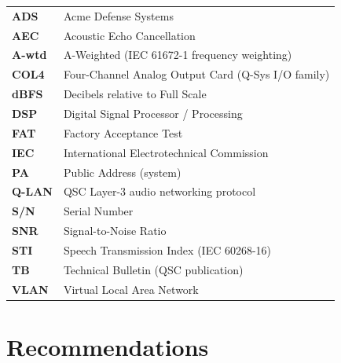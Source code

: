 \documentclass[11pt,letterpaper]{article}
\begin{document}
\vspace{2pt}
{\renewcommand{\arraystretch}{1.25}
\begin{tabularx}{\linewidth}{@{}>{\color{accent}\bfseries}l@{\hspace{8mm}}>{\raggedright\arraybackslash}X@{}}
ADS       & Acme Defense Systems \\
AEC       & Acoustic Echo Cancellation \\
A-wtd     & A-Weighted (IEC 61672-1 frequency weighting) \\
COL4      & Four-Channel Analog Output Card (Q-Sys I/O family) \\
dBFS      & Decibels relative to Full Scale \\
DSP       & Digital Signal Processor / Processing \\
FAT       & Factory Acceptance Test \\
IEC       & International Electrotechnical Commission \\
PA        & Public Address (system) \\
Q-LAN     & QSC Layer-3 audio networking protocol \\
S/N       & Serial Number \\
SNR       & Signal-to-Noise Ratio \\
STI       & Speech Transmission Index (IEC 60268-16) \\
TB        & Technical Bulletin (QSC publication) \\
VLAN      & Virtual Local Area Network \\
\end{tabularx}
}

\section{Recommendations}
\end{document}
